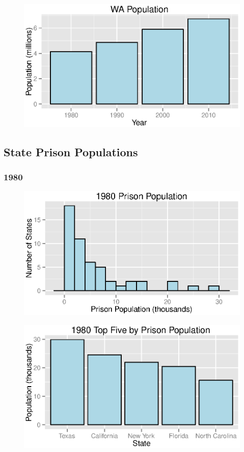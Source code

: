 \documentclass{exam}
\begin{document}
  \begin{figure}[H]
    \centering
    \includegraphics[scale = 0.9]{wa_population.eps}
  \end{figure}

  \subsection{State Prison Populations}
  \subsubsection{1980}
  \begin{figure}[H]
    \centering
    \includegraphics[scale = 0.9]{1980_pp_histogram.eps}
  \end{figure}

  \begin{figure}[H]
    \centering
    \includegraphics[scale = 0.9]{top_five_1980.eps}
  \end{figure}
\end{document}
